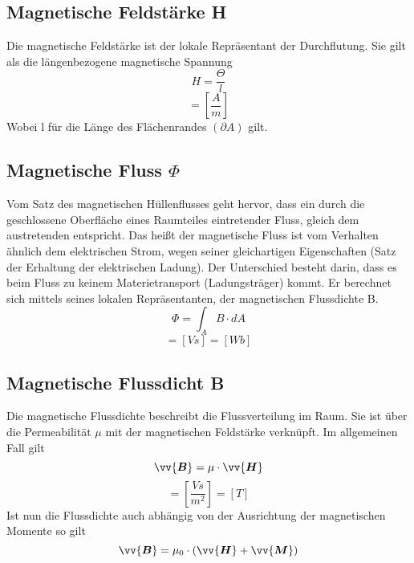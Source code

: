 \documentclass[a4paper,twoside,12pt,DIV=13,BCOR=5mm,numbers=noenddot,cleardoublepage=empty]{scrbook}
\begin{document}
        \subsection{Magnetische Feldst\"arke H}
        Die magnetische Feldst\"arke ist der lokale Repr\"asentant der Durchflutung. 
        Sie gilt als die l\"angenbezogene magnetische Spannung
        \begin{equation}
            H = \frac{\Theta}{l}
        \end{equation}
        \begin{equation}
            [H]=[\frac{A}{m}]
        \end{equation}
        Wobei l f\"ur die L\"ange des Fl\"achenrandes $(\partial A)$ gilt.
        \subsection{Magnetische Fluss $\Phi$}
        Vom Satz des magnetischen H\"ullenflusses geht hervor, 
        dass ein durch die geschlossene Oberfl\"ache eines Raumteiles 
        eintretender Fluss, gleich dem austretenden entspricht. Das hei\ss{}t 
        der magnetische Fluss ist vom Verhalten \"ahnlich dem elektrischen Strom, 
        wegen seiner gleichartigen Eigenschaften (Satz der Erhaltung der 
        elektrischen Ladung). Der Unterschied besteht darin, dass es beim Fluss zu 
        keinem Materietransport (Ladungstr\"ager) kommt. Er berechnet sich mittels 
        seines lokalen Repr\"asentanten, der magnetischen Flussdichte B.
        \begin{equation}
            \Phi = \int_A B \cdot dA
        \end{equation}
        \begin{equation}
            [\Phi]=[Vs]=[Wb]
        \end{equation}
        \subsection{Magnetische Flussdicht B}
        Die magnetische Flussdichte beschreibt die Flussverteilung im Raum. Sie ist 
        \"uber die Permeabilit\"at $\mu$ mit der magnetischen Feldst\"arke verkn\"upft. Im 
        allgemeinen Fall gilt
        \begin{equation}
            \vv{\bm{B}}=\mu \cdot \vv{\bm{H}}
        \end{equation}
        \begin{equation}
            [B]=[\frac{Vs}{m^2}]=[T]
        \end{equation}
        Ist nun die Flussdichte auch abh\"angig von der Ausrichtung der magnetischen 
        Momente so gilt
        \begin{equation}
            \vv{\bm{B}}=\mu_\mathrm{0} \cdot (\vv{\bm{H}} + \vv{\bm{M}})
        \end{equation}
\end{document}
